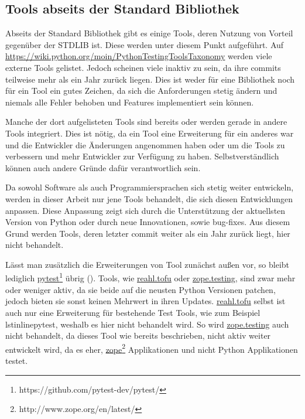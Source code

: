 \subsection{Tools abseits der Standard Bibliothek}\label{python-tools:extlib}
Abseits der Standard Bibliothek gibt es einige Tools, deren Nutzung von
Vorteil gegenüber der STDLIB ist. Diese werden unter diesem Punkt aufgeführt.
Auf \url{https://wiki.python.org/moin/PythonTestingToolsTaxonomy} werden viele
externe Tools gelistet. Jedoch scheinen viele inaktiv zu sein, da ihre
\glspl{commit} teilweise mehr als ein Jahr zurück liegen. Dies ist weder für
eine Bibliothek noch für ein Tool ein gutes Zeichen, da sich die Anforderungen
stetig ändern und niemals alle Fehler behoben und Features implementiert sein
können.

Manche der dort aufgelisteten Tools sind bereits oder werden gerade in andere
Tools integriert. Dies ist nötig, da ein Tool eine Erweiterung für ein anderes
war und die Entwickler die Änderungen angenommen haben oder um die Tools zu
verbessern und mehr Entwickler zur Verfügung zu haben. Selbstverständlich
können auch andere Gründe dafür verantwortlich sein.

Da sowohl Software als auch Programmiersprachen sich stetig weiter entwickeln,
werden in dieser Arbeit nur jene Tools behandelt, die sich diesen Entwicklungen
anpassen. Diese Anpassung zeigt sich durch die Unterstützung der aktuellsten
Version von Python oder durch neue Innovationen, sowie \Gls{bug}-fixes. Aus
diesem Grund werden Tools, deren letzter \Gls{commit} weiter als ein Jahr
zurück liegt, hier nicht behandelt.

Lässt man zusätzlich die Erweiterungen von Tool zunächst außen vor, so bleibt
lediglich
\href{https://github.com/pytest-dev/pytest/}{pytest}\footnote{https://github.com/pytest-dev/pytest/}
übrig (\cite{wiki.python:PythonTestingToolsTaxonomy}).
Tools, wie
\href{https://www.reahl.org/docs/4.0/devtools/tofu.d.html}{reahl.tofu}
oder
\href{https://pypi.org/project/zope.testing/}{zope.testing},
sind zwar mehr oder weniger aktiv, da sie beide auf die neusten Python
Versionen patchen, jedoch bieten sie sonst keinen Mehrwert in ihren Updates.
\href{https://www.reahl.org/docs/4.0/devtools/tofu.d.html}{reahl.tofu}
selbst ist auch nur eine Erweiterung für bestehende Test Tools, wie zum
Beispiel lstinline{pytest}, weshalb es hier nicht behandelt wird. So wird
\href{https://pypi.org/project/zope.testing/}{zope.testing}
auch nicht behandelt, da dieses Tool wie bereits beschrieben, nicht aktiv weiter
entwickelt wird, da es eher,
\href{http://www.zope.org/en/latest/}{zope}\footnote{http://www.zope.org/en/latest/}
Applikationen und nicht Python Applikationen testet.

